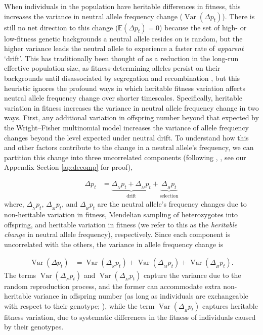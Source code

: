 \documentclass[11pt]{article}
\newcommand{\E}{\mathbb{E}}
\DeclareMathOperator{\var}{Var}
\begin{document}
When individuals in the population have heritable differences in fitness, this
increases the variance in neutral allele frequency change ($\var(\Delta p_t)$).
There is still no net direction to this change ($\E(\Delta p_t) = 0$) because
the set of high- or low-fitness genetic backgrounds a neutral allele resides on
is random, but the higher variance leads the neutral allele to experience a
faster rate of \emph{apparent} `drift'. This has traditionally been thought of
as a reduction in the long-run effective population size, as
fitness-determining alleles persist on their backgrounds until disassociated by
segregation and recombination \parencite{Robertson1961-ho,
Santiago1995-hx,Santiago1998-bs}, but this heuristic ignores the profound ways
in which heritable fitness variation affects neutral allele frequency change
over shorter timescales. Specifically, heritable variation in fitness increases
the variance in neutral allele frequency change in two ways. First, any
additional variation in offspring number beyond that expected by the
Wright--Fisher multinomial model increases the variance of allele frequency
changes beyond the level expected under neutral drift. To understand how this
and other factors contribute to the change in a neutral allele's frequency, we
can partition this change into three uncorrelated components (following
\citeauthor{Santiago1995-hx}, \citeyear{Santiago1995-hx}, see our Appendix
Section \ref{ap:decomp} for proof),

\begin{align}
  \Delta p_t %
  &= \underbrace{\Delta_{_N} p_t + \Delta_{_M} p_t}_\text{drift} + \underbrace{\Delta_{_H} p_t}_\text{selection}
  \label{eq:delp-decomp}
\end{align}
%
where, $\Delta_{_N} p_t$, $\Delta_{_M} p_t$, and $\Delta_{_H} p_t$ are the
neutral allele's frequency changes due to non-heritable variation in fitness,
Mendelian sampling of heterozygotes into offspring, and heritable variation in
fitness (we refer to this as the \emph{heritable change} in neutral allele
frequency), respectively. Since each component is uncorrelated with the others,
the variance in allele frequency change is

\begin{align}
  \var(\Delta p_t) &= \var(\Delta_{_N} p_t)  + \var(\Delta_{_M} p_t) + \var(\Delta_{_H} p_t).
  \label{eq:var-decomp-1}
\end{align}
%
The terms $\var(\Delta_{_N} p_t)$ and $\var(\Delta_{_M} p_t)$ capture the
variance due to the random reproduction process, and the former can
accommodate extra non-heritable variance in offspring number (as long as
individuals are exchangeable with respect to their genotype;
\cite{Cannings1974-ps}), while the term $\var(\Delta_{_H} p_t)$ captures
heritable fitness variation, due to systematic differences in the fitness of
individuals caused by their genotypes.
\end{document}
